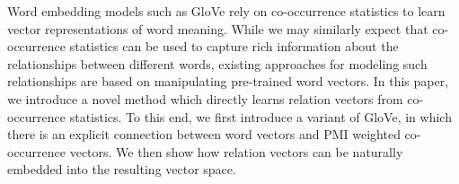 Word embedding models such as GloVe rely on co-occurrence statistics to learn vector representations of word meaning. While we may similarly expect that co-occurrence statistics can be used to capture rich information about the relationships between different words, existing approaches for modeling such relationships are based on manipulating pre-trained word vectors. In this paper, we introduce a novel method which directly learns relation vectors from co-occurrence statistics. To this end, we first introduce a variant of GloVe, in which there is an explicit connection between word vectors and PMI weighted co-occurrence vectors. We then show how relation vectors can be naturally embedded into the resulting vector space.
